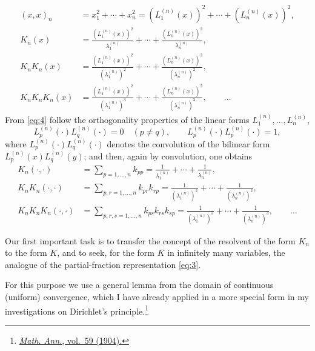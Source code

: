 \documentclass[b5paper,twoside]{article}
\newcommand{\originalpage}[1]{\phantomsection\label{origpage:#1}}
\begin{document}
\begin{equation}
\tag{5}\label{eq:5}
\begin{aligned}
  (x,x)_n
    &=x_1^2+\cdots+x_n^2
      =(L_1^{(n)}(x))^2+\cdots+(L_n^{(n)}(x))^2,\\
  K_n(x)
    &=\frac{(L_1^{(n)}(x))^2}{\lambda_1^{(n)}}
      +\cdots+
      \frac{(L_n^{(n)}(x))^2}{\lambda_n^{(n)}},\\
  K_nK_n(x)
    &=\frac{(L_1^{(n)}(x))^2}{(\lambda_1^{(n)})^2}
      +\cdots+
      \frac{(L_n^{(n)}(x))^2}{(\lambda_n^{(n)})^2},\\
  K_nK_nK_n(x)
    &=\frac{(L_1^{(n)}(x))^2}{(\lambda_1^{(n)})^3}
      +\cdots+
      \frac{(L_n^{(n)}(x))^2}{(\lambda_n^{(n)})^3},
      \qquad\ldots
\end{aligned}
\end{equation}
From \eqref{eq:4} follow the orthogonality properties of the linear forms
$L_1^{(n)},\ldots,L_n^{(n)}$,
\[
  L_p^{(n)}(\mathord{\cdot})L_q^{(n)}(\mathord{\cdot})=0
  \quad(p\ne q),
  \qquad
  L_p^{(n)}(\mathord{\cdot})L_p^{(n)}(\mathord{\cdot})=1,
\]
where $L_p^{(n)}(\mathord{\cdot})L_q^{(n)}(\mathord{\cdot})$ denotes the
convolution of the bilinear form $L_p^{(n)}(x)L_q^{(n)}(y)$; and then,
again by convolution, one obtains
\begin{equation}
\tag{6}\label{eq:6}
\begin{aligned}
  K_n(\mathord{\cdot},\mathord{\cdot})
    &=\sum_{p=1,\ldots,n}k_{pp}
      =\frac1{\lambda_1^{(n)}}+\cdots+\frac1{\lambda_n^{(n)}},\\
  K_nK_n(\mathord{\cdot},\mathord{\cdot})
    &=\sum_{p,r=1,\ldots,n}k_{pr}k_{rp}
      =\frac1{(\lambda_1^{(n)})^2}+\cdots
       +\frac1{(\lambda_n^{(n)})^2},\\
  K_nK_nK_n(\mathord{\cdot},\mathord{\cdot})
    &=\sum_{p,r,s=1,\ldots,n}k_{pr}k_{rs}k_{sp}
      =\frac1{(\lambda_1^{(n)})^3}+\cdots
       +\frac1{(\lambda_n^{(n)})^3},
       \qquad\ldots
\end{aligned}
\end{equation}

Our first important task is to transfer the concept of the resolvent of the
form $K_n$ to the form $K$, and to seek, for the form $K$ in infinitely many
variables, the analogue of the partial-fraction representation
\eqref{eq:3}.

For this purpose we use a general lemma from the domain of continuous
(uniform) convergence,\originalpage{162} which I have already applied in a more special form in
my investigations on Dirichlet's principle.\footnote{\hyperref[bib:Hilbert1904Dirichlet]{
\emph{Math. Ann.}, vol.~59 (1904).}}
\end{document}
